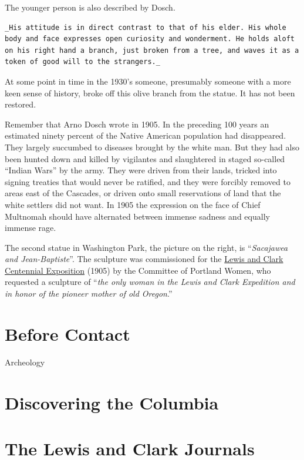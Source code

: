 \documentclass[
  12pt,
]{book}
\begin{document}
The younger person is also described by Dosch.

\begin{verbatim}
_His attitude is in direct contrast to that of his elder. His whole body and face expresses open curiosity and wonderment. He holds aloft on his right hand a branch, just broken from a tree, and waves it as a token of good will to the strangers._
\end{verbatim}

At some point in time in the 1930's someone, presumably someone with a more keen sense of history, broke off this olive branch from the statue. It has not been restored.

Remember that Arno Dosch wrote in 1905. In the preceding 100 years an estimated ninety percent of the Native American population had disappeared. They largely succumbed to diseases brought by the white man. But they had also been hunted down and killed by vigilantes and slaughtered in staged so-called ``Indian Wars'' by the army. They were driven from their lands, tricked into signing treaties that would never be ratified, and they were forcibly removed to areas east of the Cascades, or driven onto small reservations of land that the white settlers did not want. In 1905 the expression on the face of Chief Multnomah should have alternated between immense sadness and equally immense rage.

The second statue in Washington Park, the picture on the right, is ``\emph{Sacajawea and Jean-Baptiste}''. The sculpture was commissioned for the \href{https://en.wikipedia.org/wiki/Lewis_and_Clark_Centennial_Exposition}{Lewis and Clark Centennial Exposition} (1905) by the Committee of Portland Women, who requested a sculpture of ``\emph{the only woman in the Lewis and Clark Expedition and in honor of the pioneer mother of old Oregon}.''

\hypertarget{before-contact}{%
\section{Before Contact}\label{before-contact}}

Archeology

\hypertarget{discovering-the-columbia}{%
\section{Discovering the Columbia}\label{discovering-the-columbia}}

\hypertarget{the-lewis-and-clark-journals}{%
\section{The Lewis and Clark Journals}\label{the-lewis-and-clark-journals}}
\end{document}
